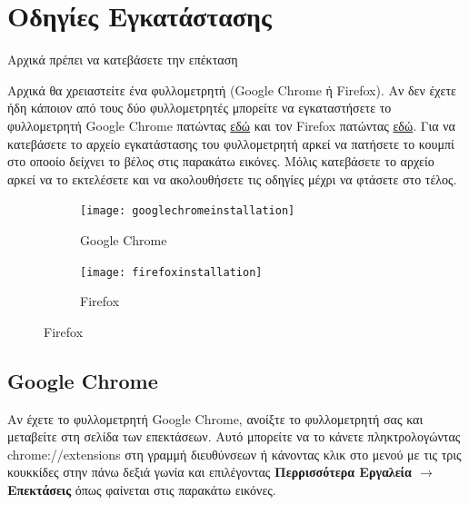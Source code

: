\documentclass{article}
\begin{document}
\section*{Οδηγίες Εγκατάστασης}

Αρχικά πρέπει να κατεβάσετε την επέκταση


Αρχικά θα χρειαστείτε ένα φυλλομετρητή (Google Chrome ή Firefox). Αν δεν έχετε ήδη κάποιον από τους δύο φυλλομετρητές μπορείτε να εγκαταστήσετε το φυλλομετρητή Google Chrome πατώντας \href{https://www.google.com/chrome/}{εδώ} και τον Firefox πατώντας \href{https://www.mozilla.org/el/firefox/new/}{εδώ}. Για να κατεβάσετε το αρχείο εγκατάστασης του φυλλομετρητή αρκεί να πατήσετε το κουμπί στο οποοίο δείχνει το βέλος στις παρακάτω εικόνες. Μόλις κατεβάσετε το αρχείο αρκεί να το εκτελέσετε και να ακολουθήσετε τις οδηγίες μέχρι να φτάσετε στο τέλος.

\begin{figure}[H]
    \centering
    \begin{subfigure}{.45\textwidth}
        \texttt{[image: googlechromeinstallation]}
        \caption{Google Chrome}
        \label{Fig:sub1}
    \end{subfigure}
    \hfill
    \begin{subfigure}{.45\textwidth}
        \texttt{[image: firefoxinstallation]}
        \caption{Firefox}
        \label{Fig:sub2}
    \end{subfigure}
\end{figure}

\subsection*{Google Chrome}
Αν έχετε το φυλλομετρητή Google Chrome, ανοίξτε το φυλλομετρητή σας και μεταβείτε στη σελίδα των επεκτάσεων. Αυτό μπορείτε να το κάνετε πληκτρολογώντας chrome://extensions στη γραμμή διευθύνσεων ή κάνοντας κλικ στο μενού με τις τρις κουκκίδες στην πάνω δεξιά γωνία και επιλέγοντας \textbf{Περρισσότερα Εργαλεία $\rightarrow$ Επεκτάσεις} όπως φαίνεται στις παρακάτω εικόνες. 
\end{document}
